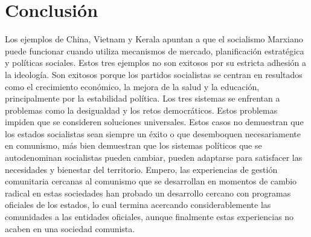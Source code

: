 \documentclass[12pt, letterpaper]{article}
\begin{document}
\section*{Conclusión}
Los ejemplos de China, Vietnam y Kerala apuntan a que el socialismo Marxiano puede funcionar cuando utiliza mecanismos de mercado, planificación estratégica y políticas sociales. Estos tres ejemplos no son exitosos por su estricta adhesión a la ideología. Son exitosos porque los partidos socialistas se centran en resultados como el crecimiento económico, la mejora de la salud y la educación, principalmente por la estabilidad política. Los tres sistemas se enfrentan a problemas como la desigualdad y los retos democráticos. Estos problemas impiden que se consideren soluciones universales. Estos casos no demuestran que los estados socialistas sean siempre un éxito o que desemboquen necesariamente en comunismo, más bien demuestran que los sistemas políticos que se autodenominan socialistas pueden cambiar, pueden adaptarse para satisfacer las necesidades y bienestar del territorio. Empero, las experiencias de gestión comunitaria cercanas al comunismo que se desarrollan en momentos de cambio radical en estas sociedades han probado un desarrollo cercano con programas oficiales de los estados, lo cual termina acercando considerablemente las comunidades a las entidades oficiales, aunque finalmente estas experiencias no acaben en una sociedad comunista.

\newpage
\printbibliography[title=Bibliografía]
\end{document}
